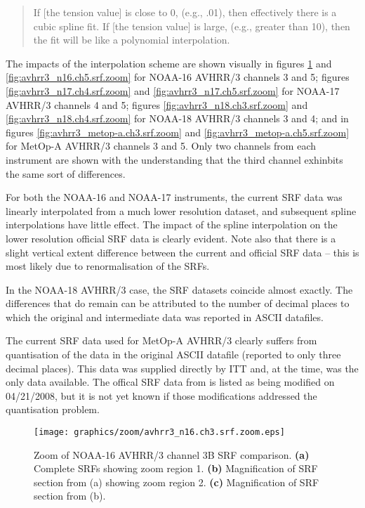 \begin{quote}
If [the tension value] is close to 0, (e.g., .01), then effectively there is a cubic spline fit. If [the tension value] is large, (e.g., greater than 10), then the fit will be like a polynomial interpolation.
\end{quote}

The impacts of the interpolation scheme are shown visually in figures \ref{fig:avhrr3_n16.ch3.srf.zoom} and \ref{fig:avhrr3_n16.ch5.srf.zoom} for NOAA-16 AVHRR/3 channels 3 and 5; figures \ref{fig:avhrr3_n17.ch4.srf.zoom} and \ref{fig:avhrr3_n17.ch5.srf.zoom} for NOAA-17 AVHRR/3 channels 4 and 5; figures \ref{fig:avhrr3_n18.ch3.srf.zoom} and \ref{fig:avhrr3_n18.ch4.srf.zoom} for NOAA-18 AVHRR/3 channels 3 and 4; and in figures \ref{fig:avhrr3_metop-a.ch3.srf.zoom} and \ref{fig:avhrr3_metop-a.ch5.srf.zoom} for MetOp-A AVHRR/3 channels 3 and 5. Only two channels from each instrument are shown with the understanding that the third channel exhinbits the same sort of differences.

For both the NOAA-16 and NOAA-17 instruments, the current SRF data was linearly interpolated from a much lower resolution dataset, and subsequent spline interpolations have little effect. The impact of the spline interpolation on the lower resolution official SRF data is clearly evident. Note also that there is a slight vertical extent difference between the current and official SRF data -- this is most likely due to renormalisation of the SRFs.

In the NOAA-18 AVHRR/3 case, the SRF datasets coincide almost exactly. The differences that do remain can be attributed to the number of decimal places to which the original and intermediate data was reported in ASCII datafiles.

The current SRF data used for MetOp-A AVHRR/3 clearly suffers from quantisation of the data in the original ASCII datafile (reported to only three decimal places). This data was supplied directly by ITT \citep{Sullivan_avhrr3_metop-a_srf} and, at the time, was the only data available. The offical SRF data from \citet{NESDIS_AVHRR_SRFs} is listed as being modified on 04/21/2008, but it is not yet known if those modifications addressed the quantisation problem.

\begin{figure}[htp]
  \centering
  \texttt{[image: graphics/zoom/avhrr3\_n16.ch3.srf.zoom.eps]}
  \caption{Zoom of NOAA-16 AVHRR/3 channel 3B SRF comparison. \textbf{(a)} Complete SRFs showing zoom region 1. \textbf{(b)} Magnification of SRF section from (a) showing zoom region 2.  \textbf{(c)} Magnification of SRF section from (b).}
  \label{fig:avhrr3_n16.ch3.srf.zoom}
\end{figure}

